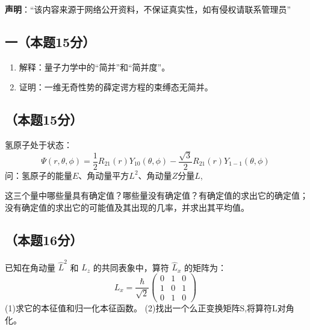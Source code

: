 
\textbf{声明}：“该内容来源于网络公开资料，不保证真实性，如有侵权请联系管理员”

\subsection{一（本题15分）}
\begin{enumerate}
\item 解释：量子力学中的“简并”和“简并度”。
\item 证明：一维无奇性势的薛定谔方程的束缚态无简并。
\end{enumerate}

\subsection{（本题15分）}
氢原子处于状态：
$$\Psi(r, \theta, \phi) = \frac{1}{2} R_{21}(r) Y_{10}(\theta, \phi) - \frac{\sqrt{3}}{2} R_{21}(r) Y_{1-1}(\theta, \phi)~$$
问：氢原子的能量$E$、角动量平方$L^2$、角动量$Z$分量$L$,

这三个量中哪些量具有确定值？哪些量没有确定值？有确定值的求出它的确定值；没有确定值的求出它的可能值及其出现的几率，并求出其平均值。

\subsection{（本题16分）}
已知在角动量 $\hat{L}^2$ 和 $\hat{L}_z$ 的共同表象中，算符 $\hat{L}_x$ 的矩阵为：
$$L_x = \frac{\hbar}{\sqrt{2}} \begin{pmatrix}
0 & 1 & 0 \\
1 & 0 & 1 \\
0 & 1 & 0
\end{pmatrix}~$$
(1)求它的本征值和归一化本征函数。
(2)找出一个么正变换矩阵S,将算符L对角化。
